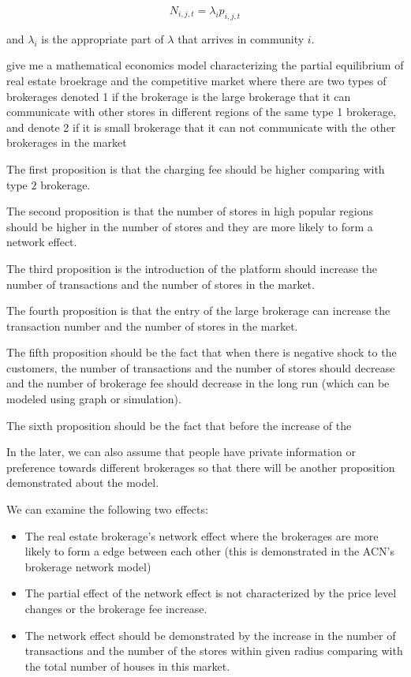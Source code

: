 \documentclass[12pt]{article}
\begin{document}
\begin{equation}
  N_{i, j, t} = \lambda_i p_{i, j, t}
\end{equation}

and $\lambda_i$ is the appropriate part of $\lambda$ that arrives in community $i$.


give me a mathematical economics model characterizing the partial equilibrium of real estate broekrage and the competitive market where there are two types of brokerages denoted 1 if the brokerage is the large brokerage that it can communicate with other stores in different regions of the same type 1 brokerage, and denote 2 if it is small brokerage that it can not communicate with the other brokerages in the market

The first proposition is that the charging fee should be higher comparing with type $2$ brokerage.

The second proposition is that the number of stores in high popular regions should be higher in the number of stores and they are more likely to form a network effect.

The third proposition is the introduction of the platform should increase the number of transactions and the number of stores in the market.

The fourth proposition is that the entry of the large brokerage can increase the transaction number and the number of stores in the market.

The fifth proposition should be the fact that when there is negative shock to the customers, the number of transactions and the number of stores should decrease and the number of brokerage fee should decrease in the long run (which can be modeled using graph or simulation).


The sixth proposition should be the fact that before the increase of the 











In the later, we can also assume that people have private information or preference towards different brokerages so that there will be another proposition demonstrated about the model.

We can examine the following two effects:

\begin{itemize}
  \item The real estate brokerage's network effect where the brokerages are more likely to form a edge between each other (this is demonstrated in the ACN's brokerage network model)
  \item The partial effect of the network effect is not characterized by the price level changes or the brokerage fee increase.
  \item The network effect should be demonstrated by the increase in the number of transactions and the number of the stores within given radius comparing with the total number of houses in this market.
\end{itemize}
\end{document}
